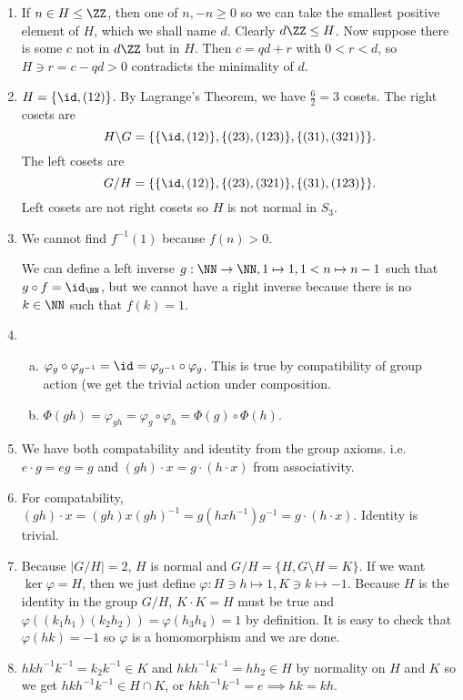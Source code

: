 \documentclass{article}
\begin{document}
\begin{enumerate}

\item If $n \in H \leq \ZZ$, then one of $n, -n \geq 0$ so we can take
the smallest positive element of $H$, which we shall name $d$. Clearly
$d\ZZ \leq H$. Now suppose there is some $c$ not in $d\ZZ$ but in $H$.
Then $c = qd + r$ with $0 < r < d$, so $H \ni r = c - qd > 0$
contradicts the minimality of $d$.

\item $H = \lbrace \id, (12) \rbrace$. By Lagrange's Theorem, we have
$\frac{6}{2} = 3$ cosets. The right cosets are
\[ H \backslash G = \lbrace \lbrace \id, (12) \rbrace, \lbrace (23),
(123) \rbrace, \lbrace (31), (321) \rbrace \rbrace. \]
The left cosets are
\[ G / H = \lbrace \lbrace \id, (12) \rbrace, \lbrace (23), (321)
\rbrace, \lbrace (31), (123) \rbrace \rbrace. \]
Left cosets are not right cosets so $H$ is not normal in $S_3$.

\item We cannot find $f^{-1}(1)$ because $f(n) > 0$.

We can define a left inverse $g : \NN \to \NN, 1 \mapsto 1, 1 < n
\mapsto n - 1$ such that $g \circ f = \id_\NN$, but we cannot have a
right inverse because there is no $k \in \NN$ such that $f(k) = 1$.

\item
\begin{enumerate}[(a)]
\item $\varphi_g \circ \varphi_{g^{-1}} = \id = \varphi_{g^{-1}} \circ
\varphi_g$. This is true by compatibility of group action (we get the
trivial action under composition.

\item $\Phi(gh) = \varphi_{gh} = \varphi_g \circ \varphi_h = \Phi(g)
\circ \Phi(h)$.
\end{enumerate}

\item We have both compatability and identity from the group axioms.
i.e. $e \cdot g = eg = g$ and $(gh) \cdot x = g \cdot (h \cdot x)$ from
associativity.

\item For compatability, $(gh) \cdot x = (gh)x(gh)^{-1} =
g(hxh^{-1})g^{-1} = g \cdot (h \cdot x)$. Identity is trivial.

\item Because $\lvert G / H \rvert = 2$, $H$ is normal and $G / H =
\lbrace H, G \setminus H = K \rbrace$. If we want $\ker \varphi = H$,
then we just define $\varphi : H \ni h \mapsto 1, K \ni k \mapsto -1$.
Because $H$ is the identity in the group $G / H$, $K \cdot K = H$ must
be true and $\varphi((k_1h_1)(k_2h_2)) = \varphi(h_3 h_4) = 1$ by
definition. It is easy to check that $\varphi(hk) = -1$ so $\varphi$ is
a homomorphism and we are done.

\item $hkh^{-1}k^{-1} = k_2k^{-1} \in K$ and $hkh^{-1}k^{-1} = hh_2 \in
H$ by normality on $H$ and $K$ so we get $hkh^{-1}k^{-1} \in H \cap K$,
or $hkh^{-1}k^{-1} = e \implies hk = kh$.

\end{enumerate}
\end{document}
